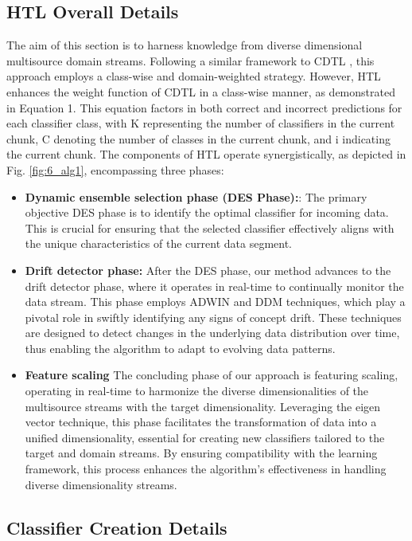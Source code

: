 \subsection{HTL Overall Details}

The aim of this section is to harness knowledge from diverse dimensional multisource domain streams. Following a similar framework to CDTL \cite{yang2021concept}, this approach employs a class-wise and domain-weighted strategy. However, HTL enhances the weight function of CDTL in a class-wise manner, as demonstrated in Equation 1. This equation factors in both correct and incorrect predictions for each classifier class, with K representing the number of classifiers in the current chunk, C denoting the number of classes in the current chunk, and i indicating the current chunk. The components of HTL operate synergistically, as depicted in Fig. \ref{fig:6_alg1}, encompassing three phases:
\begin{itemize}
	\item \textbf{Dynamic ensemble selection phase (DES Phase):}: The primary objective DES phase is to identify the optimal classifier for incoming data. This is crucial for ensuring that the selected classifier effectively aligns with the unique characteristics of the current data segment.
	\item \textbf{Drift detector phase:} After the DES phase, our method advances to the drift detector phase, where it operates in real-time to continually monitor the data stream. This phase employs ADWIN and DDM techniques, which play a pivotal role in swiftly identifying any signs of concept drift. These techniques are designed to detect changes in the underlying data distribution over time, thus enabling the algorithm to adapt to evolving data patterns.
	\item \textbf{Feature scaling} The concluding phase of our approach is featuring scaling, operating in real-time to harmonize the diverse dimensionalities of the multisource streams with the target dimensionality. Leveraging the eigen vector technique, this phase facilitates the transformation of data into a unified dimensionality, essential for creating new classifiers tailored to the target and domain streams. By ensuring compatibility with the learning framework, this process enhances the algorithm's effectiveness in handling diverse dimensionality streams.
\end{itemize}
\subsection{Classifier Creation Details }

